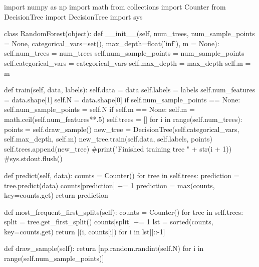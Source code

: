 \documentclass{article}
\begin{document}
\begin{python}
import numpy as np
import math
from collections import Counter
from DecisionTree import DecisionTree
import sys

class RandomForest(object):
    def __init__(self, num_trees, num_sample_points = None,
        categorical_vars=set(), max_depth=float('inf'), m = None):
        self.num_trees = num_trees
        self.num_sample_points = num_sample_points
        self.categorical_vars = categorical_vars
        self.max_depth = max_depth
        self.m = m

    def train(self, data, labels):
        self.data = data
        self.labels = labels
        self.num_features = data.shape[1]
        self.N = data.shape[0]
        if self.num_sample_points == None:
            self.num_sample_points = self.N
        if self.m == None:
            self.m = math.ceil(self.num_features**.5)
        self.trees = []
        for i in range(self.num_trees):
            points = self.draw_sample()
            new_tree = DecisionTree(self.categorical_vars, self.max_depth, self.m)
            new_tree.train(self.data, self.labels, points)
            self.trees.append(new_tree)
            #print("Finished training tree " + str(i + 1))
            #sys.stdout.flush()

    def predict(self, data):
        counts = Counter()
        for tree in self.trees:
            prediction = tree.predict(data)
            counts[prediction] += 1
        prediction = max(counts, key=counts.get)
        return prediction

    def most_frequent_first_splits(self):
        counts = Counter()
        for tree in self.trees:
            split = tree.get_first_split()
            counts[split] += 1
        lst = sorted(counts, key=counts.get)
        return [(i, counts[i]) for i in lst][::-1]

    def draw_sample(self):
        return [np.random.randint(self.N) for i in range(self.num_sample_points)]
\end{python}

\newpage
\end{document}

